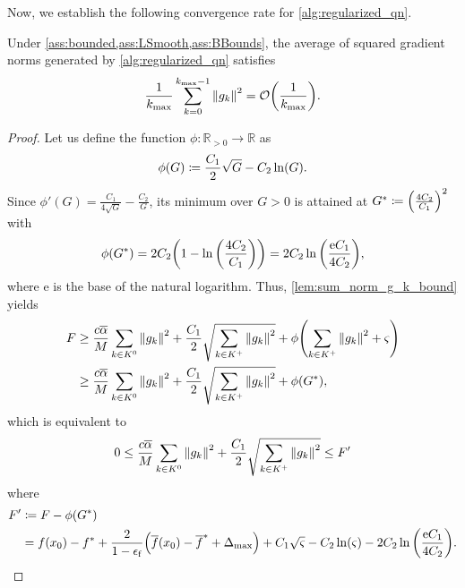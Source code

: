 \documentclass[journal]{subfiles}
\begin{document}
Now, we establish the following convergence rate for \cref{alg:regularized_qn}.
\begin{theorem}\label{thm:gc}
    Under \cref{ass:bounded,ass:LSmooth,ass:BBounds}, the average of squared gradient norms generated by \cref{alg:regularized_qn} satisfies
    \begin{equation*}
        \frac{1}{k_{\max}} \sum_{k=0}^{k_{\max}-1} \norm{g_k}^2 = \order{\frac{1}{k_{\max}}}.
    \end{equation*}
\end{theorem}
\begin{proof}
    Let us define the function $\phi\colon \mathbb{R}_{>0} \to \mathbb{R}$ as
    \begin{equation}\label{eq:phi_G}
        \phi(G) \coloneqq \frac{C_1}{2} \sqrt{G} - C_2 \ln(G).
    \end{equation}
    Since $\phi'(G)= \frac{C_1}{4 \sqrt{G}} - \frac{C_2}{G}$, its minimum over $G>0$ is attained at $G^\ast \coloneqq \qty(\frac{4C_2}{C_1})^2$ with
    \begin{equation*}
        \phi(G^\ast) = 2C_2 \qty(1 - \ln\qty(\frac{4C_2}{C_1})) = 2C_2 \ln\qty(\frac{\mathrm{e} C_1}{4C_2}),
    \end{equation*}
    where $\mathrm{e}$ is the base of the natural logarithm.
    Thus, \cref{lem:sum_norm_g_k_bound} yields
    \begin{align*}
        F
         & \ge
        \frac{c \overline{\alpha}}{M} \sum_{k \in K^0} \norm{g_{k}}^2 + \frac{C_1}{2} \sqrt{\sum_{k \in K^+} \norm{g_{k}}^2} + \phi\qty(\sum_{k \in K^+} \norm{g_{k}}^2 + \varsigma) \\
         & \ge \frac{c \overline{\alpha}}{M} \sum_{k \in K^0} \norm{g_{k}}^2 + \frac{C_1}{2} \sqrt{\sum_{k \in K^+} \norm{g_{k}}^2} + \phi(G^\ast),
    \end{align*}
    which is equivalent to
    \begin{equation}\label{eq:final_inequality_for_gc}
        0 \leq \frac{c \overline{\alpha}}{M} \sum_{k \in K^0} \norm{g_{k}}^2 + \frac{C_1}{2} \sqrt{\sum_{k \in K^+} \norm{g_{k}}^2} \leq F'
    \end{equation}
    where
    \begin{align*}
        F' & \coloneqq F - \phi(G^\ast)                                                                                                                                                              \\
           & = f(x_0) - f^* + \frac{2}{1-\epsilon_\mathrm{f}} \qty(\overline{f}(x_0) - \overline{f}^* + \Delta_{\max}) + C_1 \sqrt{\varsigma} - C_2 \ln(\varsigma) - 2C_2 \ln\qty(\frac{\mathrm{e} C_1}{4C_2}).
    \end{align*}


\end{proof}
\end{document}
